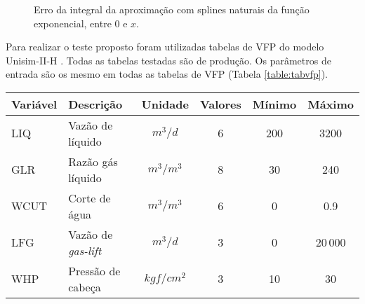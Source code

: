 \documentclass[final,5p]{elsarticle}
\numberwithin{equation}{section}
\begin{document}
        \begin{figure}[hbt!] 
            \caption{Erro da integral da aproximação com splines naturais da função exponencial, entre 0 e $x$.}
            \label{fig:intexp}
        \end{figure}
        
        Para realizar o teste proposto foram utilizadas tabelas de VFP do modelo Unisim-II-H \cite{maschio2018case}. Todas as tabelas testadas são de produção. Os parâmetros de entrada são os mesmo em todas as tabelas de VFP (Tabela \ref{table:tabvfp}).

        \begin{table*} 
            \caption{Parâmetros das tabelas de VFP do modelo Unisim-II-H. O parâmetro principal (BHP) é em $kgf/cm^2$.}
            \label{table:tabvfp}
            \begin{tabular}{ l l c c c c }
                \hline
                Variável & Descrição & Unidade & Valores & Mínimo & Máximo \\ 
                \hline
                LIQ  & Vazão de líquido         & $m^3/d$    & 6 & 200 &   3200 \\
                GLR  & Razão gás líquido        & $m^3/m^3$  & 8 & 30  &    240 \\
                WCUT & Corte de água            & $m^3/m^3$  & 6 &  0  &    0.9 \\
                LFG  & Vazão de \emph{gas-lift} & $m^3/d$    & 3 &  0  &  20$\,$000 \\
                WHP  & Pressão de cabeça        & $kgf/cm^2$ & 3 & 10  &     30 \\
                \hline
            \end{tabular}
        \end{table*}
\end{document}

